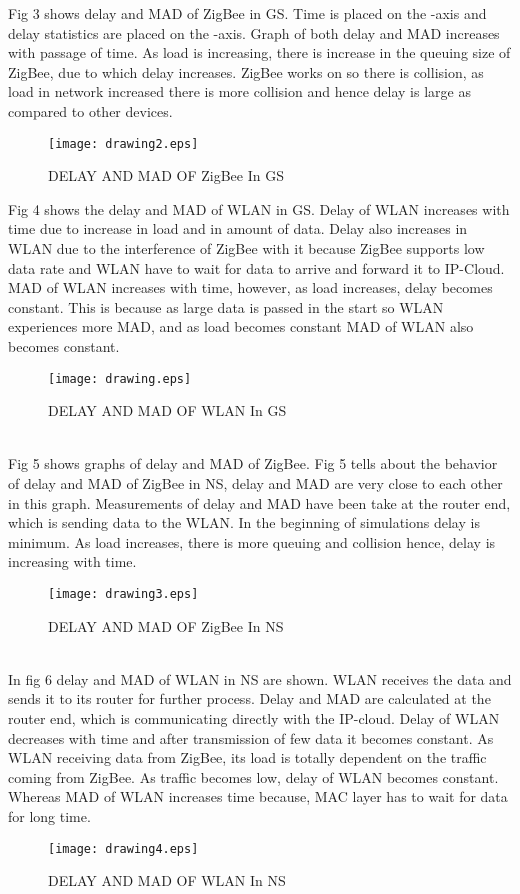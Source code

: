 \documentclass[11pt, conference, compsocconf, onecolumn]{IEEEtran}
\begin{document}
\indent Fig 3 shows delay and MAD of ZigBee in GS. Time is placed on the -axis and delay statistics are placed on the -axis. Graph of both delay
and MAD increases with passage of time. As load is increasing, there is increase in the queuing size of ZigBee, due to which delay increases. ZigBee works on  so there is collision, as load in network increased there is more collision and hence delay is large as compared to other devices.
\begin{figure}[!b]
\centering
\caption{DELAY AND MAD OF ZigBee In GS}
\texttt{[image: drawing2.eps]}
\end{figure}

\indent Fig 4 shows the delay and MAD of WLAN in GS. Delay of WLAN increases with time due to increase in load and in amount of data. Delay also increases in WLAN due to the interference of ZigBee with it because ZigBee supports low data rate and WLAN have to wait for data to arrive and forward it to IP-Cloud. MAD of WLAN increases with time, however, as load increases, delay becomes constant. This is because as large data is passed in the start so WLAN experiences more MAD, and as load becomes constant MAD of WLAN also becomes constant.
\begin{figure}[!b]
\centering
\caption{DELAY AND MAD OF WLAN In GS}
\texttt{[image: drawing.eps]}
\end{figure}
\\
\indent Fig 5 shows graphs of delay and MAD of ZigBee. Fig 5 tells about the behavior of delay and MAD of ZigBee in NS, delay and MAD are
very close to each other in this graph. Measurements of delay and MAD have been take at the router end, which is sending data to the WLAN. In the beginning
of simulations delay is minimum. As load increases, there is more queuing and collision hence, delay is increasing with time.
\begin{figure}[!b]
\centering
\caption{DELAY AND MAD OF ZigBee In NS}
\texttt{[image: drawing3.eps]}
\end{figure}
\\
\indent In fig 6 delay and MAD of WLAN in NS are shown. WLAN receives the data and sends it to its router for further process. Delay and MAD are calculated at the router end, which is communicating directly with the IP-cloud. Delay of WLAN decreases with time and after transmission of few data it becomes constant. As WLAN receiving data from ZigBee, its load is totally dependent on the traffic coming from ZigBee. As traffic becomes low, delay of WLAN becomes constant. Whereas MAD of WLAN increases time because, MAC layer has to wait for data for long time.
\begin{figure}[!h]
\centering
\caption{DELAY AND MAD OF WLAN In NS}
\texttt{[image: drawing4.eps]}
\end{figure}
\end{document}
